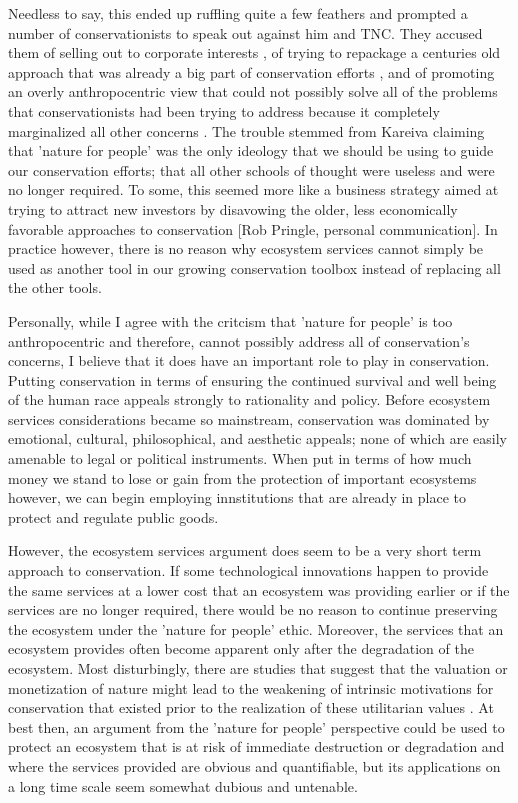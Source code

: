 \documentclass[rutwik_proposal.tex]{subfiles}
\begin{document}
Needless to say, this ended up ruffling quite a few feathers and prompted a number of conservationists to speak out against him and TNC. They accused them of selling out to corporate interests \cite{Soule14}, of trying to repackage a centuries old approach that was already a big part of conservation efforts \cite{Greenwald13, Doak14}, and of promoting an overly anthropocentric view that could not possibly solve all of the problems that conservationists had been trying to address because it completely marginalized all other concerns \cite{Doak14}. The trouble stemmed from Kareiva claiming that 'nature for people' was the only ideology that we should be using to guide our conservation efforts; that all other schools of thought were useless and were no longer required. To some, this seemed more like a business strategy aimed at trying to attract new investors by disavowing the older, less economically favorable approaches to conservation [Rob Pringle, personal communication]. In practice however, there is no reason why ecosystem services cannot simply be used as another tool in our growing conservation toolbox instead of replacing all the other tools.

Personally, while I agree with the critcism that 'nature for people' is too anthropocentric and therefore, cannot possibly address all of conservation's concerns, I believe that it does have an important role to play in conservation. Putting conservation in terms of ensuring the continued survival and well being of the human race appeals strongly to rationality and policy. Before ecosystem services considerations became so mainstream, conservation was dominated by emotional, cultural, philosophical, and aesthetic appeals; none of which are easily amenable to legal or political instruments. When put in terms of how much money we stand to lose or gain from the protection of important ecosystems however, we can begin employing innstitutions that are already in place to protect and regulate public goods.

However, the ecosystem services argument does seem to be a very short term approach to conservation. If some technological innovations happen to provide the same services at a lower cost that an ecosystem was providing earlier or if the services are no longer required, there would be no reason to continue preserving the ecosystem under the 'nature for people' ethic. Moreover, the services that an ecosystem provides often become apparent only after the degradation of the ecosystem. Most disturbingly, there are studies that suggest that the valuation or monetization of nature might lead to the weakening of intrinsic motivations for conservation that existed prior to the realization of these utilitarian values \cite{Agrawal15}. At best then, an argument from the 'nature for people' perspective could be used to protect an ecosystem that is at risk of immediate destruction or degradation and where the services provided are obvious and quantifiable, but its applications on a long time scale seem somewhat dubious and untenable.
\end{document}
